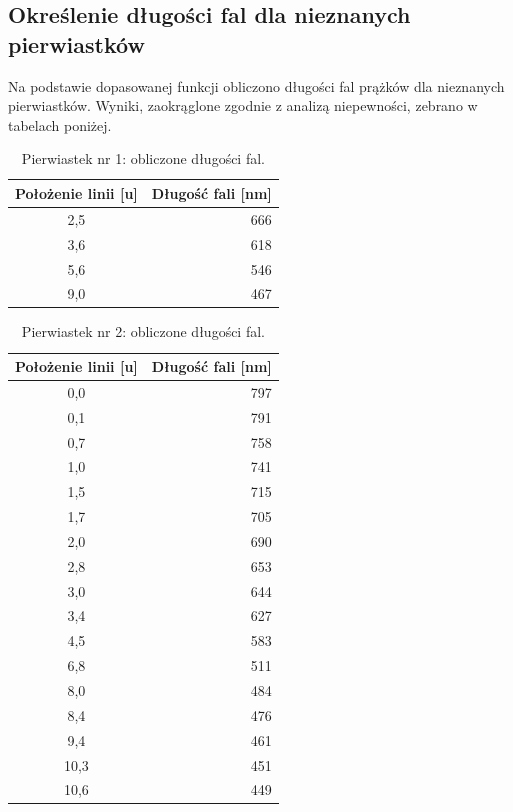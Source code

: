 \documentclass[a4paper,12pt]{article}
\begin{document}
\subsection{Określenie długości fal dla nieznanych pierwiastków}

Na podstawie dopasowanej funkcji obliczono długości fal prążków dla nieznanych pierwiastków. Wyniki, zaokrąglone zgodnie z analizą niepewności, zebrano w tabelach poniżej.

\begin{table}[H]
    \centering
    \begin{tabular}{|c|r|}
        \hline
        Położenie linii [u] & Długość fali [nm] \\ \hline
        2{,}5 & 666 \\ \hline
        3{,}6 & 618 \\ \hline
        5{,}6 & 546 \\ \hline
        9{,}0 & 467 \\ \hline
    \end{tabular}
    \caption{Pierwiastek nr 1: obliczone długości fal.}
    \label{tab:unknown1}
\end{table}

\begin{table}[H]
    \centering
    \begin{tabular}{|c|r|}
        \hline
        Położenie linii [u] & Długość fali [nm] \\ \hline
        0{,}0 & 797 \\ \hline
        0{,}1 & 791 \\ \hline
        0{,}7 & 758 \\ \hline
        1{,}0 & 741 \\ \hline
        1{,}5 & 715 \\ \hline
        1{,}7 & 705 \\ \hline
        2{,}0 & 690 \\ \hline
        2{,}8 & 653 \\ \hline
        3{,}0 & 644 \\ \hline
        3{,}4 & 627 \\ \hline
        4{,}5 & 583 \\ \hline
        6{,}8 & 511 \\ \hline
        8{,}0 & 484 \\ \hline
        8{,}4 & 476 \\ \hline
        9{,}4 & 461 \\ \hline
        10{,}3 & 451 \\ \hline
        10{,}6 & 449 \\ \hline
    \end{tabular}
    \caption{Pierwiastek nr 2: obliczone długości fal.}
    \label{tab:unknown2}
\end{table}
\end{document}
